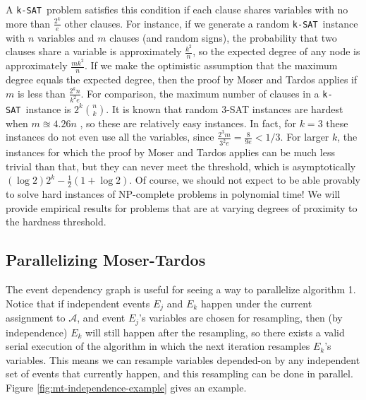 \documentclass[twocolumn]{article}
\newcommand{\ksat}{\texttt{k-SAT}~}
\begin{document}
A \ksat problem satisfies this condition if each clause shares variables with no more than $\frac{2^k}{e}$ other clauses.  For instance, if we generate a random \ksat instance with $n$ variables and $m$ clauses (and random signs), the probability that two clauses share a variable is approximately $\frac{k^2}{n}$, so the expected degree of any node is approximately $\frac{m k^2}{n}$.  If we make the optimistic assumption that the maximum degree equals the expected degree, then the proof by Moser and Tardos applies if $m$ is less than $\frac{2^k n}{k^2 e}$.  For comparison, the maximum number of clauses in a \ksat instance is $2^k {n \choose k}$.  It is known that random 3-SAT instances are hardest when $m \approxeq 4.26 n$ \cite{gomes2008satisfiability}, so these are relatively easy instances.  In fact, for $k = 3$ these instances do not even use all the variables, since $\frac{2^3 m}{3^2 e} = \frac{8}{9e} < 1/3$.  For larger $k$, the instances for which the proof by Moser and Tardos applies can be much less trivial than that, but they can never meet the threshold, which is asymptotically $(\log 2) 2^k - \frac{1}{2}(1 + \log 2)$\cite{coja2014asymptotic}.  Of course, we should not expect to be able provably to solve hard instances of NP-complete problems in polynomial time!  We will provide empirical results for problems that are at varying degrees of proximity to the hardness threshold.

\subsection{Parallelizing Moser-Tardos}
The event dependency graph is useful for seeing a way to parallelize algorithm 1.  Notice that if independent events $E_j$ and $E_k$ happen under the current assignment to $\mathcal{A}$, and event $E_j$'s variables are chosen for resampling, then (by independence) $E_k$ will still happen after the resampling, so there exists a valid serial execution of the algorithm in which the next iteration resamples $E_k$'s variables.  This means we can resample variables depended-on by any independent set of events that currently happen, and this resampling can be done in parallel.  Figure \ref{fig:mt-independence-example} gives an example.
\end{document}
